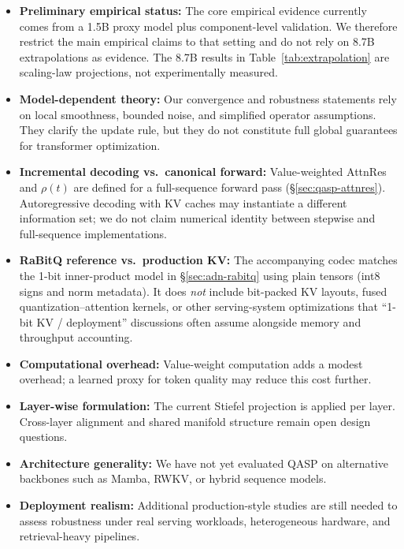 \documentclass[twocolumn]{article}
\begin{document}
\begin{itemize}
    \item \textbf{Preliminary empirical status:} The core empirical evidence currently comes from a 1.5B proxy model plus component-level validation. We therefore restrict the main empirical claims to that setting and do not rely on 8.7B extrapolations as evidence. The 8.7B results in Table~\ref{tab:extrapolation} are scaling-law projections, not experimentally measured.
    \item \textbf{Model-dependent theory:} Our convergence and robustness statements rely on local smoothness, bounded noise, and simplified operator assumptions. They clarify the update rule, but they do not constitute full global guarantees for transformer optimization.
    \item \textbf{Incremental decoding vs.\ canonical forward:} Value-weighted AttnRes and $\rho(t)$ are defined for a full-sequence forward pass (\S\ref{sec:qasp-attnres}). Autoregressive decoding with KV caches may instantiate a different information set; we do not claim numerical identity between stepwise and full-sequence implementations.
    \item \textbf{RaBitQ reference vs.\ production KV:} The accompanying codec matches the 1-bit inner-product model in \S\ref{sec:adn-rabitq} using plain tensors (int8 signs and norm metadata). It does \emph{not} include bit-packed KV layouts, fused quantization--attention kernels, or other serving-system optimizations that ``1-bit KV / deployment'' discussions often assume alongside memory and throughput accounting.
    \item \textbf{Computational overhead:} Value-weight computation adds a modest overhead; a learned proxy for token quality may reduce this cost further.
    \item \textbf{Layer-wise formulation:} The current Stiefel projection is applied per layer. Cross-layer alignment and shared manifold structure remain open design questions.
    \item \textbf{Architecture generality:} We have not yet evaluated QASP on alternative backbones such as Mamba, RWKV, or hybrid sequence models.
    \item \textbf{Deployment realism:} Additional production-style studies are still needed to assess robustness under real serving workloads, heterogeneous hardware, and retrieval-heavy pipelines.
\end{itemize}
\end{document}
